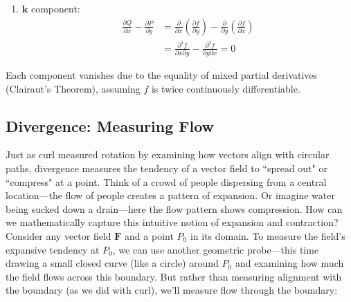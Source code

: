 \begin{example}
\begin{solution}
\begin{enumerate}
\begin{enumerate}
\item $\mathbf{k}$ component:
\begin{align*}
\frac{\partial Q}{\partial x} - \frac{\partial P}{\partial y} 
&= \frac{\partial}{\partial x}\left(\frac{\partial f}{\partial y}\right) - \frac{\partial}{\partial y}\left(\frac{\partial f}{\partial x}\right) \\
&= \frac{\partial^2 f}{\partial x\partial y} - \frac{\partial^2 f}{\partial y\partial x} = 0
\end{align*}
\end{enumerate}

Each component vanishes due to the equality of mixed partial derivatives (Clairaut's Theorem), assuming $f$ is twice continuously differentiable.
\end{enumerate}
\end{solution}
\end{example}
\exampleline

\subsection*{Divergence: Measuring Flow}

\noindent Just as curl measured rotation by examining how vectors align with circular paths, divergence measures the tendency of a vector field to ``spread out" or ``compress" at a point. Think of a crowd of people dispersing from a central location—the flow of people creates a pattern of expansion. Or imagine water being sucked down a drain—here the flow pattern shows compression. How can we mathematically capture this intuitive notion of expansion and contraction? \\

\noindent Consider any vector field $\mathbf{F}$ and a point $P_0$ in its domain. To measure the field's expansive tendency at $P_0$, we can use another geometric probe—this time drawing a small closed curve (like a circle) around $P_0$ and examining how much the field flows across this boundary. But rather than measuring alignment with the boundary (as we did with curl), we'll measure flow through the boundary:

